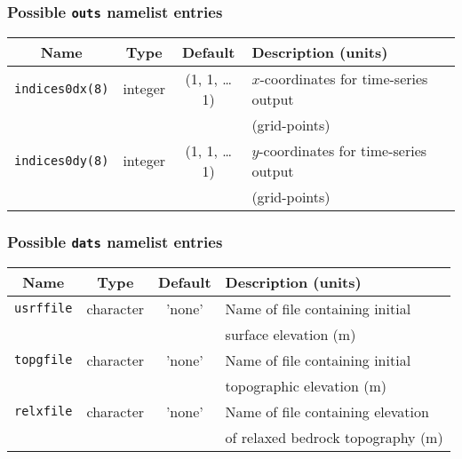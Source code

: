 \documentclass[11pt]{article}
\begin{document}
\subsubsection{Possible \texttt{outs} namelist entries}
%
\begin{center}
\begin{tabular}{|c|c|c|l|}
\hline
Name & Type & Default & Description (units)\\
\hline
\hline
\texttt{indices0dx(8)} & integer & (1, 1, \ldots 1) & $x$-coordinates for
time-series output \\
 & & & (grid-points) \\
\hline
\texttt{indices0dy(8)} & integer & (1, 1, \ldots 1) & $y$-coordinates for
time-series output \\
 & & & (grid-points) \\
\hline
\end{tabular}
\end{center}
%
\subsubsection{Possible \texttt{dats} namelist entries}
%
\begin{center}
\begin{tabular}{|c|c|c|l|}
\hline
Name & Type & Default & Description (units)\\
\hline
\hline
\texttt{usrffile} & character & 'none' & Name of file containing initial  \\
 & & & surface elevation (m) \\
\hline
\texttt{topgfile} & character & 'none' & Name of file containing initial \\
 & & & topographic elevation (m) \\
\hline
\texttt{relxfile} & character & 'none' & Name of file containing elevation \\
 & & & of relaxed bedrock topography (m) \\ 
\hline
\end{tabular}
\end{center}
%
\end{document}
